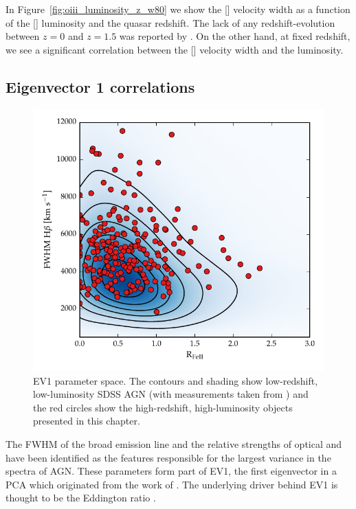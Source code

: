 In Figure~\ref{fig:oiii_luminosity_z_w80} we show the [] velocity width as a function of the [] luminosity and the quasar redshift. 
The lack of any redshift-evolution between $z=0$ and $z=1.5$ was reported by \citet{harrison16}.
On the other hand, at fixed redshift, we see a significant correlation between the [] velocity width and the luminosity. 

\subsection{Eigenvector 1 correlations}

\begin{figure}
    \includegraphics[width=\columnwidth]{figures/chapter04/ev1_lowz.pdf} 
    \caption[{EV1 parameter space.}]{EV1 parameter space. The contours and shading show low-redshift, low-luminosity SDSS AGN (with measurements taken from \citet{shen11}) and the red circles show the high-redshift, high-luminosity objects presented in this chapter.}      
    \label{fig:ev1_lowz}
\end{figure}

The FWHM of the broad \hb emission line and the relative strengths of optical  and \hb have been identified as the features responsible for the largest variance in the spectra of AGN. 
These parameters form part of EV1, the first eigenvector in a PCA which originated from the work of \citet{boroson92}.   
The underlying driver behind EV1 is thought to be the Eddington ratio \citep[e.g.][]{sulentic00b,shen14}. 

